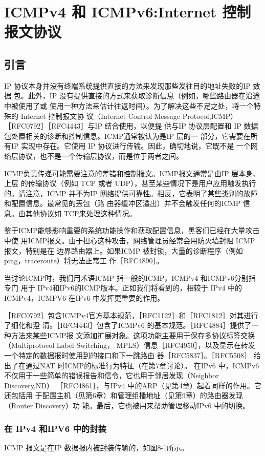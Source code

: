 \chapter{ICMPv4 和 ICMPv6:Internet 控制报文协议}
\section{引言}
IP 协议本身并没有终端系统提供直接的方法来发现那些发往目的地址失败的IP 数据
包。此外，IP 没有提供直接的方式来获取诊断信息（例如，哪些路由器在沿途中被使用了或
使用一种方法来估计往返时间）。为了解决这些不足之处，将一个特殊的 Internet 控制报文协
议（Internet Control Message Protocol,ICMP）［RFC0792］［RFC4443］与IP 结合使用，以便提
供与IP 协议层配置和 IP 数据包处置相关的诊断和控制信息。ICMP通常被认为是IP 层的一
部分，它需要在所有IP 实现中存在。它使用 IP 协议进行传输。因此，确切地说，它既不是
一个网络层协议，也不是一个传输层协议，而是位于两者之间。

ICMP负责传递可能需要注意的差错和控制报文。ICMP报文通常是由IP 层本身、上层
的传输协议（例如 TCP 或者 UDP），甚至某些情况下是用户应用触发执行的。请注意，ICMP
并不为IP 网络提供可靠性。相反，它表明了某些类别的故障和配置信息。最常见的丟包（路
由器缓冲区溢出）并不会触发任何的ICMP 信息。由其他协议如 TCP来处理这种情况。

鉴于ICMP能够影响重要的系统功能操作和获取配置信息，黑客们已经在大量攻击中使
用ICMP报文。由于担心这种攻击，网络管理员经常会用防火墙封阻 ICMP 报文，特别是在
边界路由器上。如果ICMP 被封锁，大量的诊断程序（例如 ping，traceroute）将无法正常工
作［RFC4890］。

当讨论ICMP时，我们用术语ICMP 指一般的ICMP，ICMPv4 和ICMPv6分别指专门
用于 IPv4和IPv6的ICMP版本。正如我们将看到的，相较于 IPv4 中的ICMPv4，ICMPV6
在IPv6 中发挥更重要的作用。

［RFC0792］包含ICMPv4官方基本规范，［RFC1122］和［RFC1812］对其进行了细化和澄
清。［RFC4443］包含了ICMPv6 的基本规范。［RFC4884］提供了一种方法来某些ICMP报
文添加扩展对象。这项功能主要用于保存多协议标签交换（Multiprotocol Label Switching，
MPLS）信息［RFC4950］，以及显示在转发一个特定的数据报时使用到的接口和下一跳路由
器［RFC5837］。［RFC5508］ 给出了在通过NAT 时ICMP的标准行为特征（在第7章讨论）。
在IPv6 中，ICMPv6 不仅用于一些简单的错误报告和信令，它也用于邻居发现（Neighbor
Discovery,ND） ［RFC4861］，与IPv4 中的ARP（见第4章）起着同样的作用。它还包括用
于配置主机（见第6章）和管理组播地址（见第9章）的路由器发现（Router Discovery）功
能。最后，它也被用来帮助管理移动IPv6 中的切换。

\subsection{在 IPv4 和IPV6 中的封装}
ICMP 报文是在IP 数据报内被封装传输的，如图8-1所示。

